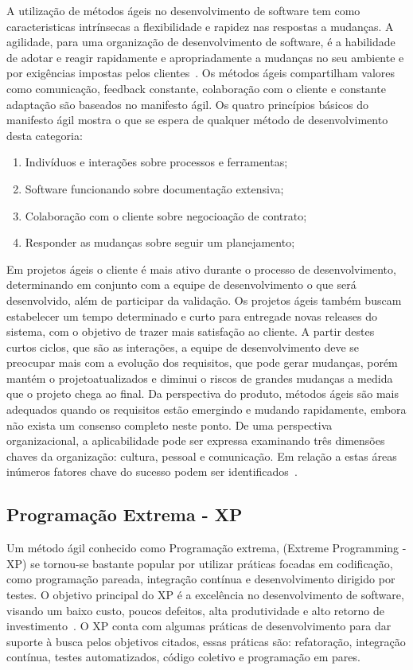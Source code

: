 A utilização de métodos ágeis no desenvolvimento de software tem como caracteristicas 
intrínsecas a flexibilidade e rapidez nas respostas a mudanças. 
%
A agilidade, para uma organização de desenvolvimento de software, é a habilidade de
adotar e reagir rapidamente e apropriadamente a mudanças no seu ambiente e por exigências
impostas pelos clientes~\cite{nerur2005}.
%
Os métodos ágeis compartilham valores como comunicação, feedback constante, colaboração 
com o cliente e constante adaptação são baseados no manifesto ágil. Os quatro princípios 
básicos do manifesto ágil mostra o que se espera de qualquer método de desenvolvimento 
desta categoria:
%
\begin{enumerate}
\item Indivíduos  e interações sobre processos e ferramentas;
\item Software funcionando sobre documentação extensiva;
\item Colaboração com o cliente sobre negocioação de contrato;
\item Responder as  mudanças sobre seguir um planejamento;
\end{enumerate}
%
Em projetos ágeis o cliente é mais ativo durante o processo de desenvolvimento, determinando
em conjunto com a equipe de desenvolvimento o que será desenvolvido, além de participar
da validação. Os projetos ágeis também buscam estabelecer um tempo determinado e curto 
para entregade novas releases do sistema, com o objetivo de trazer mais satisfação ao 
cliente.
%
A partir destes curtos ciclos, que são as interações, a equipe de desenvolvimento deve
se preocupar mais com a evolução dos requisitos, que pode gerar mudanças, porém mantém o 
projetoatualizados e diminui o riscos de grandes mudanças a medida que o projeto chega ao 
final.
%
Da perspectiva do produto, métodos ágeis são mais adequados quando os requisitos estão 
emergindo e mudando rapidamente, embora não exista um consenso completo neste ponto. De 
uma perspectiva organizacional, a aplicabilidade pode ser expressa examinando três dimensões 
chaves da organização: cultura, pessoal e comunicação. Em relação a estas áreas inúmeros 
fatores chave do sucesso podem ser identificados~\cite{cohen2004}.

\subsection{Programação Extrema - XP}

Um método ágil conhecido como Programação extrema, (Extreme Programming - XP) se tornou-se 
bastante popular por utilizar práticas focadas em codificação, como programação pareada, 
integração contínua e desenvolvimento dirigido por testes.
%
O objetivo principal do XP é a excelência no desenvolvimento de software, visando um baixo 
custo, poucos defeitos, alta produtividade e alto retorno de investimento~\cite{sato2007}.
O XP conta com algumas práticas de desenvolvimento para dar suporte à busca pelos objetivos 
citados, essas práticas são: refatoração, integração contínua, testes automatizados, código 
coletivo e programação em pares.
%





